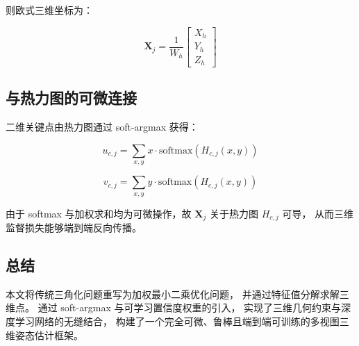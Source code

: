 则欧式三维坐标为：

\[
\mathbf{X}_j =
\frac{1}{W_h}
\begin{bmatrix}
X_h \\
Y_h \\
Z_h
\end{bmatrix}
\]

\subsection{与热力图的可微连接}

二维关键点由热力图通过 soft-argmax 获得：

\[
u_{c,j} = \sum_{x,y} x \cdot
\mathrm{softmax}(H_{c,j}(x,y))
\]

\[
v_{c,j} = \sum_{x,y} y \cdot
\mathrm{softmax}(H_{c,j}(x,y))
\]

由于 softmax 与加权求和均为可微操作，故
$\mathbf{X}_j$ 关于热力图 $H_{c,j}$ 可导，
从而三维监督损失能够端到端反向传播。

\subsection{总结}

本文将传统三角化问题重写为加权最小二乘优化问题，
并通过特征值分解求解三维点。
通过 soft-argmax 与可学习置信度权重的引入，
实现了三维几何约束与深度学习网络的无缝结合，
构建了一个完全可微、鲁棒且端到端可训练的多视图三维姿态估计框架。
